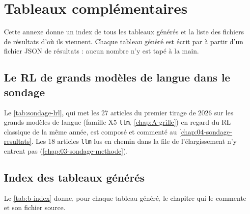 \chapter{Tableaux complémentaires}
\label{chap:B-tableaux}

Cette annexe donne un index de tous les tableaux générés et la liste des fichiers de résultats d'où
ils viennent. Chaque tableau généré est
écrit par  à partir d'un fichier JSON de résultats : aucun nombre n'y
est tapé à la main.

\section{Le RL de grands modèles de langue dans le sondage}
\label{sec:b-lrl}

Le \cref{tab:sondage-lrl}, qui met les 27 articles du premier tirage de 2026 sur les grands modèles de
langue (famille X5 \texttt{llm}, \cref{chap:A-grille}) en regard du RL classique de la même année, est
composé et commenté au \cref{chap:04-sondage-resultats}. Les 18 articles \texttt{llm} lus en chemin dans
la file de l'élargissement n'y entrent pas (\cref{chap:03-sondage-methode}).

\section{Index des tableaux générés}
\label{sec:b-index}

Le \cref{tab:b-index} donne, pour chaque tableau généré, le chapitre qui le commente et son fichier
source.

